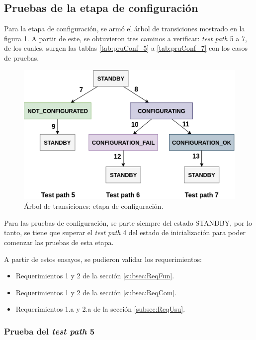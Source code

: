 \subsection{Pruebas de la etapa de configuración}

Para la etapa de configuración, se armó el árbol de transiciones mostrado en la figura \ref{fig:ArTrans_2}. A partir de este, se obtuvieron tres caminos a verificar: \textit{test path} 5 a 7, de los cuales, surgen las tablas \ref{tab:pruConf_5} a \ref{tab:pruConf_7} con los casos de pruebas.

\begin{figure}[htpb]
	\centering
	\includegraphics[scale=1]{./Figures/ArTrans_2.png}
	\caption{Árbol de transiciones: etapa de configuración.}
	\label{fig:ArTrans_2}
\end{figure}

Para las pruebas de configuración, se parte siempre del estado STANDBY, por lo tanto, se tiene que superar el \textit{test path} 4 del estado de inicialización para poder comenzar las pruebas de esta etapa.

\pagebreak

A partir de estos ensayos, se pudieron validar los requerimientos: 
\begin{itemize}
\item Requerimientos 1 y 2 de la sección \ref{subsec:ReqFun}.
\item Requerimientos 1 y 2 de la sección \ref{subsec:ReqCom}.
\item Requerimientos 1.a y 2.a de la sección \ref{subsec:ReqUsu}.
\end{itemize}

\subsubsection{Prueba del \textit{test path} 5}
\label{subsubsec:pruConf_5}

